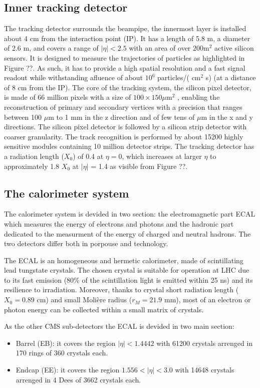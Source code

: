 \subsection{Inner tracking detector}
The tracking detector surrounds the beampipe, the innermost layer is installed
about 4 cm from the interaction point (IP). It has a length of 5.8 m, a diameter of 2.6 m,
and covers a range of $|\eta| < 2.5$ with an area of over $200$m$^{2}$ active silicon sensors. It is
designed to measure the trajectories of particles as highlighted in Figure ??. As such,
it has to provide a high spatial resolution and a fast signal readout while withstanding afluence
of about $10^6$ particles/( cm$^2$ s) (at a distance of 8 cm from
the IP).
The core of the tracking system, the silicon pixel detector, is made of 66 million pixels
with a size of $100 \times 150 \mu$m$^2$ , enabling the reconstruction of primary and secondary
vertices with a precision that ranges between 100 $\mu$m to 1 mm in the z direction and of few tens of $\mu$m
in the x and y directions. The silicon pixel detector is followed by a silicon strip detector with coarser
granularity. The track recognition is performed by about 15200 highly sensitive
modules containing 10 million detector strips. The tracking detector has a radiation length ($X_0$) of 0.4 at $\eta = 0$,
which increases at larger $\eta$ to approximately 1.8 $X_0$ at $|\eta|$ = 1.4 as visible from Figure ??.

\subsection{The calorimeter system}
The calorimeter system is devided in two section: the electromagnetic part ECAL which measures the energy
of electrons and photons and the hadronic part dedicated to the measurment of the energy of charged and
neutral hadrons. The two detectors differ both in porpouse and technology.

The ECAL is an homogeneous and hermetic calorimeter, made of scintillating lead tungstate
crystals. The chosen crystal is suitable for operation at LHC due to its fast emission
(80\% of the scintillation light is emitted within 25 ns) and its resilience to irradiation. Moreover,
thanks to crystal short radiation length ($X_0 = 0.89$ cm) and small Molière radius ($r_M = 21.9$
mm), most of an electron or photon energy can be collected within a small matrix of crystals.

As the other CMS sub-detectors the ECAL is devided in two main section:
\begin{itemize}%
\item Barrel (EB): it covers the region $|\eta| < 1.4442$ with 61200 crystals arrenged in 170 rings of 360 crystals each.
\item Endcap (EE): it covers the region $1.556 < |\eta| < 3.0$ with 14648 crystals arrenged in 4 Dees of 3662 crystals each.
\end{itemize}

